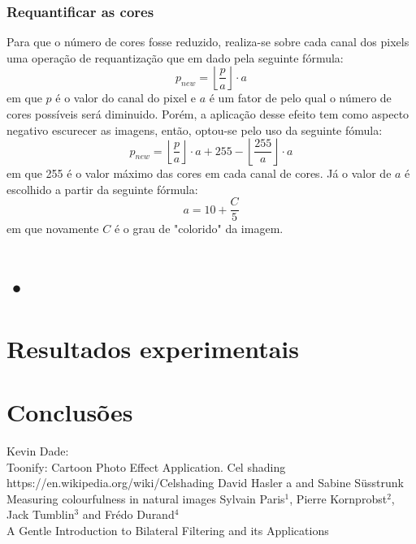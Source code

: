 \documentclass[10pt,technote]{IEEEtran}
\begin{document}
			\subsubsection{Requantificar as cores}
			Para que o número de cores fosse reduzido, realiza-se sobre cada canal dos pixels uma operação de requantização que em dado pela seguinte fórmula:
			$$
			p_{new} = \left\lfloor\frac{p}{a}\right\rfloor \cdot a
			$$
			em que $p$ é o valor do canal do pixel e $a$ é um fator de pelo qual o número de cores possíveis será diminuido. Porém, a aplicação desse efeito tem como aspecto negativo escurecer as imagens, então, optou-se pelo uso da seguinte fómula:
			$$
			p_{new} = \left\lfloor\frac{p}{a}\right\rfloor \cdot a
			+ 255 - \left\lfloor\frac{255}{a}\right\rfloor \cdot a
			$$
			em que 255 é o valor máximo das cores em cada canal de cores. Já o valor de $a$ é escolhido a partir da seguinte fórmula:
			$$
			a = 10 + \frac{C}{5}
			$$
			em que novamente $C$ é o grau de "colorido" da imagem.
			
			\section{•}
							
\section{Resultados experimentais}

\section{Conclusões}

\begin{thebibliography}{20}
	Kevin Dade:\\
	Toonify: Cartoon Photo Effect Application.
	Cel shading\\
	https://en.wikipedia.org/wiki/Celshading
	David Hasler a and Sabine Süsstrunk\\
	Measuring colourfulness in natural images
	Sylvain Paris$^1$, Pierre Kornprobst$^2$, Jack Tumblin$^3$ and Frédo Durand$^4$\\
	A Gentle Introduction to Bilateral Filtering and its Applications
	


\end{thebibliography}
\end{document}
